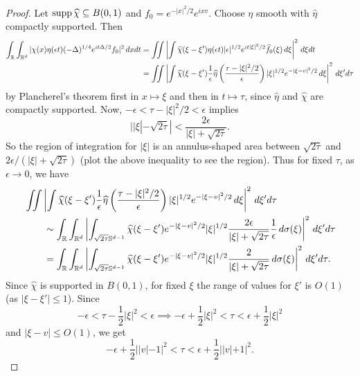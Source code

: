 \begin{proof}
  Let $\operatorname{supp} \widehat{\chi} \subseteq B(0, 1)$ and
  $f_0 = e^{-|x|^2 / 2} e^{ixv}$. Choose
  $\eta$ smooth with $\widehat{\eta}$ compactly supported.
  Then
  \begin{align*}
    \int_{\mathbb{R}} \int_{\mathbb{R}^d}
    |\chi(x) \eta(\epsilon t) (-\Delta)^{1 / 4} e^{it \Delta / 2} f_0|^2\, dxdt
    &= \iint\left|\int \widehat{\chi}(\xi - \xi') \eta(\epsilon t) |\epsilon|^{1 / 2} e^{it|\xi|^2 / 2} \widehat{f}_0(\xi)\, d\xi\right|^2\, d\xi dt \\
    &= \iint \left| \int \widehat{\chi}(\xi - \xi') \frac{1}{\epsilon} \widehat{\eta}\left(\frac{\tau - |\xi|^2 / 2}{\epsilon}\right)|\xi|^{1 / 2} e^{-|\xi - v|^2 / 2}\, d\xi\right|^2\, d\xi' d\tau
  \end{align*}
  by Plancherel's theorem first in $x \mapsto \xi$
  and then in $t \mapsto \tau$, since
  $\widehat{\eta}$ and $\widehat{\chi}$ are compactly
  supported. Now, $-\epsilon < \tau - |\xi|^2 / 2 < \epsilon$
  implies
  \[
    ||\xi| - \sqrt{2\tau}| < \frac{2\epsilon}{|\xi| + \sqrt{2\tau}}.
  \]
  So the region of integration  for $|\xi|$ is an
  annulus-shaped area between $\sqrt{2\tau}$ and
  $2\epsilon / (|\xi| + \sqrt{2\tau})$ (plot the
  above inequality to see the region).
  Thus for fixed $\tau$, as $\epsilon \to 0$,
  we have
  \begin{align*}
    &\iint \left| \int \widehat{\chi}(\xi - \xi') \frac{1}{\epsilon} \widehat{\eta}\left(\frac{\tau - |\xi|^2 / 2}{\epsilon}\right)|\xi|^{1 / 2} e^{-|\xi - v|^2 / 2}\, d\xi\right|^2\, d\xi' d\tau \\
    &\quad \quad \sim \int_{\mathbb{R}} \int_{\mathbb{R}^d}
    \left| \int_{\sqrt{2\tau} \mathbb{S}^{d - 1}} \widehat{\chi}(\xi - \xi') e^{-|\xi - v|^2 / 2} |\xi|^{1 / 2} \frac{2\epsilon}{|\xi| + \sqrt{2\tau}} \frac{1}{\epsilon}\, d\sigma(\xi)\right|^2\, d\xi' d\tau \\
    & \quad \quad = \int_{\mathbb{R}} \int_{\mathbb{R}^d} \left| \int_{\sqrt{2\tau} \mathbb{S}^{d - 1}} \widehat{\chi}(\xi - \xi') e^{-|\xi - v|^2 / 2} |\xi|^{1 / 2} \frac{2}{|\xi| + \sqrt{2\tau}} \, d\sigma(\xi)\right|^2\, d\xi' d\tau.
  \end{align*}
  Since $\widehat{\chi}$ is supported in $B(0, 1)$, for
  fixed $\xi$ the range of values for $\xi'$ is $O(1)$
  (as $|\xi - \xi'| \le 1$). Since
  \[
    -\epsilon < \tau - \frac{1}{2} |\xi|^2 < \epsilon
    \implies -\epsilon + \frac{1}{2} |\xi|^2 < \tau < \epsilon + \frac{1}{2} |\xi|^2
  \]
  and $|\xi - v| \le O(1)$, we get
  \[
    -\epsilon + \frac{1}{2} ||v| - 1|^2
    < \tau < \epsilon + \frac{1}{2} ||v| + 1|^2.
\]
\end{proof}
